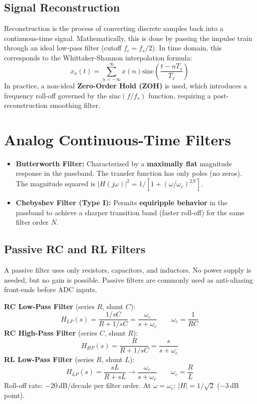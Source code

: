 \documentclass[12pt,a4paper]{article}
\begin{document}
\subsection{Signal Reconstruction}
Reconstruction is the process of converting discrete samples back into a continuous-time signal. Mathematically, this is done by passing the impulse train through an ideal low-pass filter (cutoff $f_c = f_s/2$). In time domain, this corresponds to the Whittaker-Shannon interpolation formula:
\[
x_a(t) = \sum_{n=-\infty}^{\infty} x(n) \text{sinc}\left(\frac{t - nT_s}{T_s}\right)
\]
In practice, a non-ideal \textbf{Zero-Order Hold (ZOH)} is used, which introduces a frequency roll-off governed by the $\text{sinc}(f/f_s)$ function, requiring a post-reconstruction smoothing filter.

\section{Analog Continuous-Time Filters}

\begin{tcolorbox}[defbox, title={\textbf{Butterworth vs. Chebyshev Filters}}]
\begin{itemize}[leftmargin=*, itemsep=2pt, topsep=0pt]
  \item \textbf{Butterworth Filter:} Characterized by a \textbf{maximally flat} magnitude response in the passband. The transfer function has only poles (no zeros). The magnitude squared is $|H(j\omega)|^2 = 1 / [1 + (\omega/\omega_c)^{2N}]$.
  \item \textbf{Chebyshev Filter (Type I):} Permits \textbf{equiripple behavior} in the passband to achieve a sharper transition band (faster roll-off) for the same filter order $N$.
\end{itemize}
\end{tcolorbox}

\subsection{Passive RC and RL Filters}
A passive filter uses only resistors, capacitors, and inductors. No power supply is needed, but no gain is possible. Passive filters are commonly used as anti-aliasing front-ends before ADC inputs.

\begin{tcolorbox}[formulabox, title={\textbf{First-Order Passive Filter Transfer Functions}}]
\textbf{RC Low-Pass Filter} (series $R$, shunt $C$):
\[
H_{LP}(s) = \frac{1/sC}{R + 1/sC} = \frac{\omega_c}{s + \omega_c} \qquad \omega_c = \frac{1}{RC}
\]
\textbf{RC High-Pass Filter} (series $C$, shunt $R$):
\[
H_{HP}(s) = \frac{R}{R + 1/sC} = \frac{s}{s + \omega_c}
\]
\textbf{RL Low-Pass Filter} (series $R$, shunt $L$):
\[
H_{LP}(s) = \frac{sL}{R + sL} \rightarrow \frac{\omega_c}{s + \omega_c} \qquad \omega_c = \frac{R}{L}
\]
Roll-off rate: $-20\,$dB/decade per filter order. At $\omega = \omega_c$: $|H| = 1/\sqrt{2}$ ($-3\,$dB point).
\end{tcolorbox}
\end{document}
